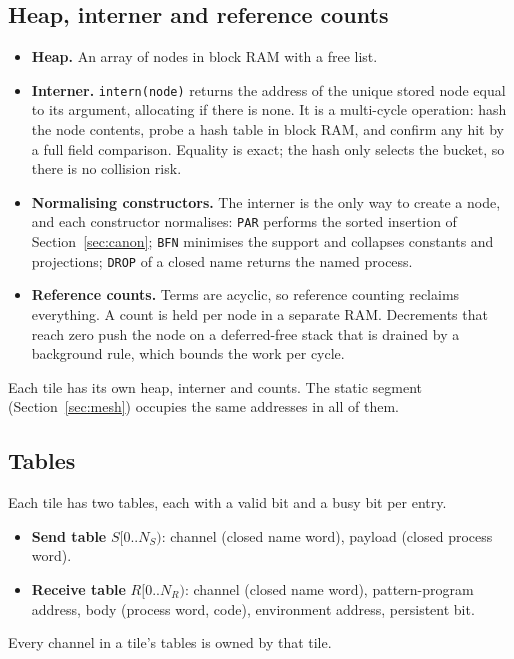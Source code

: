 \documentclass[10.5pt,a4paper]{extarticle}
\newcommand{\kw}[1]{\texttt{#1}}
\theoremstyle{definition}
\theoremstyle{remark}
\begin{document}
\subsection{Heap, interner and reference counts}\label{sec:heap}

\begin{itemize}
\item \textbf{Heap.} An array of nodes in block RAM with a free list.
\item \textbf{Interner.} \kw{intern(node)} returns the address of the unique
stored node equal to its argument, allocating if there is none. It is a
multi-cycle operation: hash the node contents, probe a hash table in block
RAM, and confirm any hit by a full field comparison. Equality is exact; the
hash only selects the bucket, so there is no collision risk.
\item \textbf{Normalising constructors.} The interner is the only way to
create a node, and each constructor normalises: \kw{PAR} performs the sorted
insertion of Section~\ref{sec:canon}; \kw{BFN} minimises the support and
collapses constants and projections; \kw{DROP} of a closed name returns the
named process.
\item \textbf{Reference counts.} Terms are acyclic, so reference counting
reclaims everything. A count is held per node in a separate RAM.
Decrements that reach zero push the node on a deferred-free stack that is
drained by a background rule, which bounds the work per cycle.
\end{itemize}

Each tile has its own heap, interner and counts. The static segment
(Section~\ref{sec:mesh}) occupies the same addresses in all of them.

\subsection{Tables}

Each tile has two tables, each with a valid bit and a busy bit per entry.
\begin{itemize}
\item \textbf{Send table} $S[0..N_S)$: channel (closed name word), payload
(closed process word).
\item \textbf{Receive table} $R[0..N_R)$: channel (closed name word),
pattern-program address, body (process word, code), environment address,
persistent bit.
\end{itemize}
Every channel in a tile's tables is owned by that tile.
\end{document}
